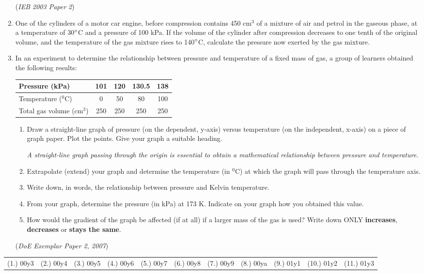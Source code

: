 \begin{eocexercises}{}
\begin{enumerate}
{(\textit{IEB 2003 Paper 2})
}

\item{One of the cylinders of a motor car engine, before compression contains 450 cm$^{3}$ of a mixture of air and petrol in the gaseous phase, at a temperature of 30$^{\circ}$C and a pressure of 100 kPa. If the volume of the cylinder after compression decreases to one tenth of the original volume, and the temperature of the gas mixture rises to 140$^{\circ}$C, calculate the pressure now exerted by the gas mixture.}

\item{In an experiment to determine the relationship between pressure and temperature of a fixed mass of gas, a group of learners obtained the following results:}

\begin{center}
\begin{tabular}{|l|c|c|c|c|}\hline
Pressure (kPa) & 101 & 120 & 130.5 & 138 \\\hline
Temperature ($^{0}$C) & 0 & 50 & 80 & 100 \\\hline
Total gas volume (cm$^{3}$) & 250 & 250 & 250 & 250 \\\hline
\end{tabular}
\end{center}

\begin{enumerate}
\item{Draw a straight-line graph of pressure (on the dependent, y-axis) versus temperature (on the independent, x-axis) on a piece of graph paper. Plot the points. Give your graph a suitable heading.}

\textit{A straight-line graph passing through the origin is essential to obtain a mathematical relationship between pressure and temperature.}

\item{Extrapolate (extend) your graph and determine the temperature (in $^{0}$C) at which the graph will pass through the temperature axis.}
\item{Write down, in words, the relationship between pressure and Kelvin temperature.}
\item{From your graph, determine the pressure (in kPa) at 173 K. Indicate on your graph how you obtained this value.}
\item{How would the gradient of the graph be affected (if at all) if a larger mass of the gas is used? Write down ONLY \textbf{increases}, \textbf{decreases} or \textbf{stays the same}.}
\end{enumerate}

(\textit{DoE Exemplar Paper 2, 2007})


\end{enumerate}

\practiceinfo

\begin{tabular}[h]{cccccc}
(1.) 00y3 & (2.) 00y4 & (3.) 00y5 & (4.) 00y6 & (5.) 00y7 & (6.) 00y8 & (7.) 00y9 & (8.) 00ya & (9.) 01y1 & (10.) 01y2 & (11.) 01y3
 \end{tabular}
\end{eocexercises}



